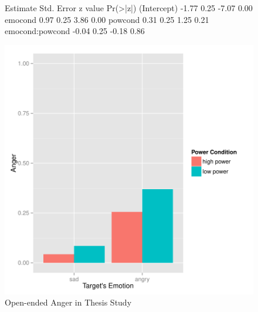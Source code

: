 \documentclass[man,apacite,floatsintext]{apa6}
\begin{document}
\begin{figure}
\begin{Schunk}
\begin{Soutput}
                Estimate Std. Error z value Pr(>|z|)
(Intercept)        -1.77       0.25   -7.07     0.00
emocond             0.97       0.25    3.86     0.00
powcond             0.31       0.25    1.25     0.21
emocond:powcond    -0.04       0.25   -0.18     0.86
\end{Soutput}
\end{Schunk}
\includegraphics{PowerResults-ThesisOpenAngry}
\caption{Open-ended Anger in Thesis Study}
\end{figure}
\newpage
\end{document}
